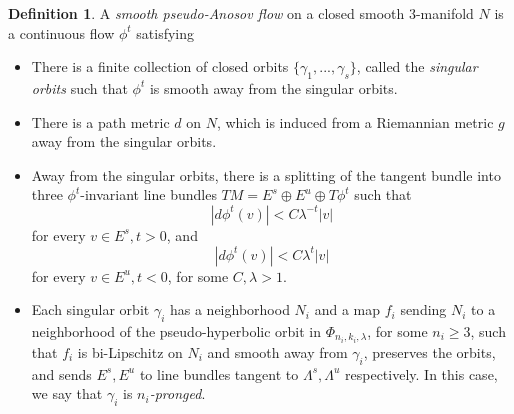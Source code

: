 \documentclass[12pt]{amsart}
\theoremstyle{definition}
\newtheorem{defn}[thm]{Definition}
\numberwithin{equation}{section}
\begin{document}
\begin{defn} \label{defn:pAflow}
A \textit{smooth pseudo-Anosov flow} on a closed smooth 3-manifold $N$ is a continuous flow $\phi^t$ satisfying
\begin{itemize}
    \item There is a finite collection of closed orbits $\{\gamma_1, ..., \gamma_s \}$, called the \textit{singular orbits} such that $\phi^t$ is smooth away from the singular orbits.
    \item There is a path metric $d$ on $N$, which is induced from a Riemannian metric $g$ away from the singular orbits.
    \item Away from the singular orbits, there is a splitting of the tangent bundle into three $\phi^t$-invariant line bundles $TM=E^s \oplus E^u \oplus T\phi^t$ such that $$|d\phi^t(v)| < C \lambda^{-t} |v|$$ for every $v \in E^s, t>0$, and $$|d\phi^t(v)| < C \lambda^t |v|$$ for every $v \in E^u, t<0$, for some $C, \lambda>1$.
    \item Each singular orbit $\gamma_i$ has a neighborhood $N_i$ and a map $f_i$ sending $N_i$ to a neighborhood of the pseudo-hyperbolic orbit in $\Phi_{n_i, k_i, \lambda}$, for some $n_i \geq 3$, such that $f_i$ is bi-Lipschitz on $N_i$ and smooth away from $\gamma_i$, preserves the orbits, and sends $E^s, E^u$ to line bundles tangent to $\Lambda^s, \Lambda^u$ respectively. In this case, we say that $\gamma_i$ is \textit{$n_i$-pronged}.
\end{itemize}


\end{defn}
\end{document}
